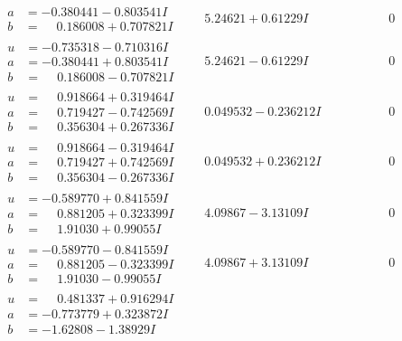 \documentclass[1p]{elsarticle_modified}
\theoremstyle{definition}
\begin{document}
$$\begin{array}{c|c|c}
\begin{aligned}
a &= -0.380441 - 0.803541 I \\
b &= \phantom{-}0.186008 + 0.707821 I\end{aligned}
 & \phantom{-}5.24621 + 0.61229 I & \phantom{-0.000000 } 0 \\ \hline\begin{aligned}
u &= -0.735318 - 0.710316 I \\
a &= -0.380441 + 0.803541 I \\
b &= \phantom{-}0.186008 - 0.707821 I\end{aligned}
 & \phantom{-}5.24621 - 0.61229 I & \phantom{-0.000000 } 0 \\ \hline\begin{aligned}
u &= \phantom{-}0.918664 + 0.319464 I \\
a &= \phantom{-}0.719427 - 0.742569 I \\
b &= \phantom{-}0.356304 + 0.267336 I\end{aligned}
 & \phantom{-}0.049532 - 0.236212 I & \phantom{-0.000000 } 0 \\ \hline\begin{aligned}
u &= \phantom{-}0.918664 - 0.319464 I \\
a &= \phantom{-}0.719427 + 0.742569 I \\
b &= \phantom{-}0.356304 - 0.267336 I\end{aligned}
 & \phantom{-}0.049532 + 0.236212 I & \phantom{-0.000000 } 0 \\ \hline\begin{aligned}
u &= -0.589770 + 0.841559 I \\
a &= \phantom{-}0.881205 + 0.323399 I \\
b &= \phantom{-}1.91030 + 0.99055 I\end{aligned}
 & \phantom{-}4.09867 - 3.13109 I & \phantom{-0.000000 } 0 \\ \hline\begin{aligned}
u &= -0.589770 - 0.841559 I \\
a &= \phantom{-}0.881205 - 0.323399 I \\
b &= \phantom{-}1.91030 - 0.99055 I\end{aligned}
 & \phantom{-}4.09867 + 3.13109 I & \phantom{-0.000000 } 0 \\ \hline\begin{aligned}
u &= \phantom{-}0.481337 + 0.916294 I \\
a &= -0.773779 + 0.323872 I \\
b &= -1.62808 - 1.38929 I\end{aligned}

\end{array}$$
\end{document}
